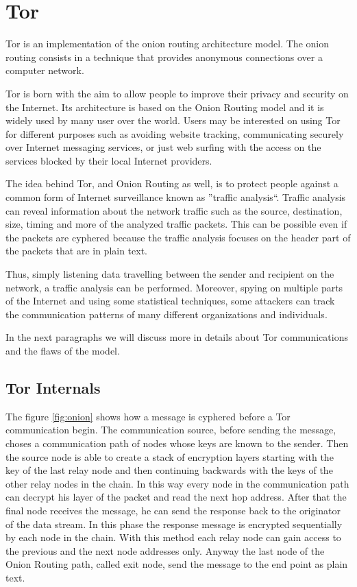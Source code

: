 \section{Tor}
\label{sec:tor}

Tor is an implementation of the onion routing architecture model. The
onion routing consists in a technique that provides anonymous
connections over a computer network\cite{goldschlag1999onion}.

Tor is born with the aim to allow people to
improve their privacy and security on the Internet. Its architecture is
based on the Onion Routing model and it is widely used by many user over
the world. Users may be interested on using Tor for different purposes
such as avoiding website tracking, communicating securely over Internet
messaging services, or just web surfing with the access on the services
blocked by their local Internet providers.

The idea behind Tor, and Onion Routing as well, is to protect people
against a common form of Internet surveillance known as ''traffic
analysis``. Traffic analysis can reveal information about the network
traffic such as the source, destination, size, timing and more of the
analyzed traffic packets. This can be possible even if the packets are
cyphered because the traffic analysis focuses on the header part of the
packets that are in plain text. 

Thus, simply listening data travelling between the sender and recipient on the network,
a traffic analysis can be performed. Moreover, spying on multiple parts
of the Internet and using some statistical techniques, some attackers can
track the communication patterns of many different organizations and
individuals.

In the next paragraphs we will discuss more in details about Tor communications 
and the flaws of the model.

\subsection{Tor Internals}
The figure \ref{fig:onion} shows how a
message is cyphered before a Tor communication begin. The communication
source, before sending the message, choses a communication path of nodes
whose keys are known to the sender.
Then the source node is able to create a stack of encryption layers starting
with the key of the last relay node and then continuing backwards with
the keys of the other relay nodes in the chain. In this way every node
in the communication path can decrypt his layer of the packet and read the next hop
address. After that the final node receives the message, he can send the
response back to the originator of the data stream. In this phase the response
message is encrypted sequentially by each node in the chain. 
With this method each relay node can gain access to the
previous and the next node addresses only. Anyway the last node of the
Onion Routing path, called exit node, send the message to the end point
as plain text.

